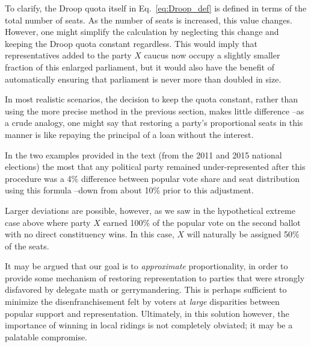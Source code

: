 \documentclass[DIV=calc, paper=a4, fontsize=11pt, twocolumn]{scrartcl}	 %
\begin{document}
To clarify, the Droop quota itself in Eq.~\ref{eq:Droop_def} is defined in terms of the total number of seats. As the number of seats is increased, this value changes. However, one might simplify the calculation by neglecting this change and keeping the Droop quota constant regardless. 
This would imply that representatives added to the party \textbf{$X$} caucus now occupy a slightly smaller fraction of this enlarged parliament, but it would also have the benefit of automatically ensuring that parliament is never more than doubled in size. 

In most realistic scenarios, the decision to keep the quota constant, rather than using the more precise method in the previous section, makes little difference \---as a crude analogy, one might say that restoring a party's proportional seats in this manner is like repaying the principal of a loan without the interest. 

In the two examples provided in the text (from the 2011 and 2015 national elections) the most that any political party remained under-represented after this procedure was a 4\% difference between popular vote share and seat distribution using this formula \---down from about 10\% prior to this adjustment. 



Larger deviations are possible, however, as we saw in the hypothetical extreme case above where party \textbf{$X$} earned 100\% of the popular vote on the second ballot with no direct constituency wins. In this case, $X$ will naturally  be assigned 50\% of the seats.

It may be argued that our goal is to \emph{approximate} proportionality, in order to provide some mechanism of restoring representation to parties that were strongly disfavored by delegate math or gerrymandering. This is perhaps sufficient to minimize the disenfranchisement felt by voters at \emph{large} disparities between popular support and representation. 
Ultimately, in this solution however, the importance of winning in local ridings is not completely obviated; it may be a palatable compromise.

\end{document}
